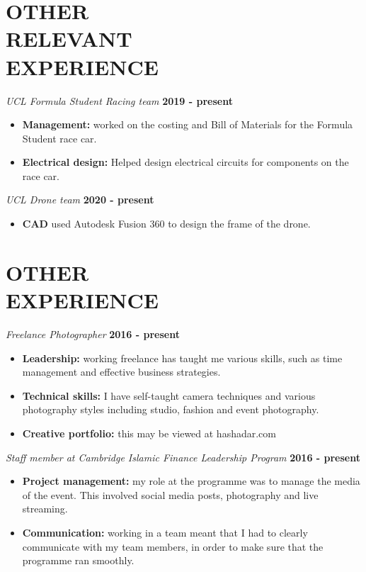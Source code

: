 \documentclass[margin, 10pt]{res} %
\begin{document}
\begin{resume}

\section{OTHER \\RELEVANT \\EXPERIENCE} 

{\sl UCL Formula Student Racing team} \hfill \textbf{2019 - present}
\begin{itemize}
  \item \textbf{Management:} worked on the costing and Bill of Materials for the Formula Student race car.
  \item \textbf{Electrical design:} Helped design electrical circuits for components on the race car.
\end{itemize}

{\sl UCL Drone team} \hfill \textbf{2020 - present}
\begin{itemize}
  \item \textbf{CAD} used Autodesk Fusion 360 to design the frame of the drone.
\end{itemize}
 
 
\section{OTHER \\ EXPERIENCE}
{\sl Freelance Photographer} \hfill \textbf{2016 - present}
\begin{itemize}
  \item \textbf{Leadership:} working freelance has taught me various skills, such as time management and effective business strategies.
  \item \textbf{Technical skills:} I have self-taught camera techniques and various photography styles including studio, fashion and event photography.
  \item \textbf{Creative portfolio:} this may be viewed at hashadar.com
\end{itemize}

{\sl Staff member at Cambridge Islamic Finance Leadership Program} \hfill \textbf{2016 - present}
\begin{itemize}
  \item \textbf{Project management:} my role at the programme was to manage the media of the event. This involved social media posts, photography and live streaming. 
  \item \textbf{Communication:} working in a team meant that I had to clearly communicate with my team members, in order to make sure that the programme ran smoothly.
\end{itemize}


\end{resume}
\end{document}
